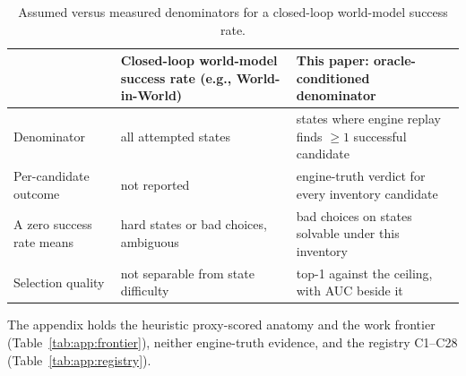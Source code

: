 \begin{table}[t]
\centering
\small
\caption{Assumed versus measured denominators for a closed-loop world-model success rate.}
\label{tab:syn:denominator}
\begin{tabular}{@{}p{}p{}p{}@{}}
\toprule
 & Closed-loop world-model success rate (e.g., World-in-World) & This paper: oracle-conditioned denominator \\
\midrule
Denominator & all attempted states & states where engine replay finds $\geq 1$ successful candidate \\
Per-candidate outcome & not reported & engine-truth verdict for every inventory candidate \\
A zero success rate means & hard states or bad choices, ambiguous & bad choices on states solvable under this inventory \\
Selection quality & not separable from state difficulty & top-1 against the ceiling, with AUC beside it \\
\bottomrule
\end{tabular}
\end{table}


The appendix holds the heuristic proxy-scored anatomy and the work frontier (Table~\ref{tab:app:frontier}), neither engine-truth evidence, and the registry C1--C28 (Table~\ref{tab:app:registry}). %


